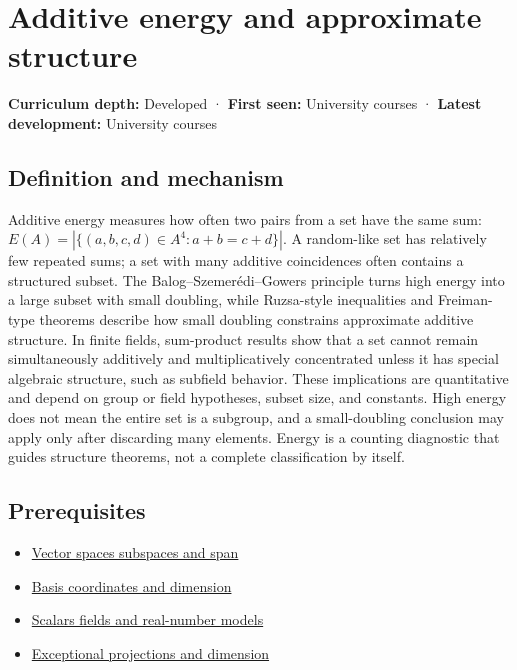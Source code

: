 \hypertarget{appendix-b0732b22e7d6}{}\label{referencestart:appendix-b0732b22e7d6}
\section{Additive energy and approximate structure}\label{appendix-b0732b22e7d6-additive-energy-and-approximate-structure}

\textbf{Curriculum depth:} Developed · \textbf{First seen:} University courses · \textbf{Latest development:} University courses

\subsection{Definition and mechanism}\label{appendix-b0732b22e7d6-definition-and-mechanism}

Additive energy measures how often two pairs from a set have the same sum: \(E(A)=|\{(a,b,c,d)\in A^4:a+b=c+d\}|\). A random-like set has relatively few repeated sums; a set with many additive coincidences often contains a structured subset. The Balog--Szemerédi--Gowers principle turns high energy into a large subset with small doubling, while Ruzsa-style inequalities and Freiman-type theorems describe how small doubling constrains approximate additive structure. In finite fields, sum-product results show that a set cannot remain simultaneously additively and multiplicatively concentrated unless it has special algebraic structure, such as subfield behavior. These implications are quantitative and depend on group or field hypotheses, subset size, and constants. High energy does not mean the entire set is a subgroup, and a small-doubling conclusion may apply only after discarding many elements. Energy is a counting diagnostic that guides structure theorems, not a complete classification by itself.

\subsection{Prerequisites}\label{appendix-b0732b22e7d6-prerequisites}

\begin{itemize}
\tightlist
\item
  \hyperref[appendix-173b52c063ae]{Vector spaces subspaces and span}
\item
  \hyperref[appendix-ce0341f7ea0d]{Basis coordinates and dimension}
\item
  \hyperref[appendix-52051ad550fe]{Scalars fields and real-number models}
\item
  \hyperref[appendix-3c73f7862157]{Exceptional projections and dimension}
\end{itemize}

